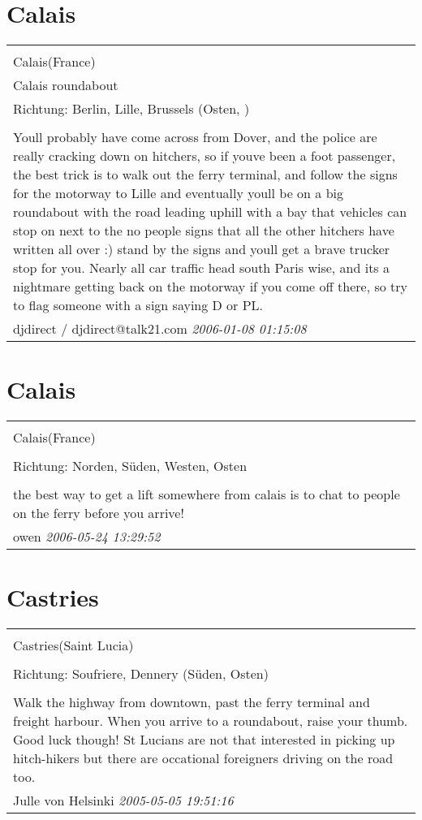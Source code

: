 \documentclass[a4paper,12pt]{article}
\begin{document}
\section{Calais}
\begin{tabular}{|p{13cm}|}
\hline\\
Calais(France)\\
Calais roundabout\\
Richtung: Berlin, Lille, Brussels (Osten, ) \\
\hline\\
Youll probably have come across from Dover, and the police are really cracking down on hitchers, so if youve been a foot passenger, the best trick is to walk out the ferry terminal, and follow the signs for the motorway to Lille and eventually youll be on a big roundabout with the road leading uphill with a bay that vehicles can stop on next to the no people signs that all the other hitchers have written all over :) stand by the signs and youll get a brave trucker stop for you. Nearly all car traffic head south Paris wise, and its a nightmare getting back on the motorway if you come off there, so try to flag someone with a sign saying D or PL. \\
djdirect / djdirect@talk21.com \textit{ 2006-01-08 01:15:08 }\\\hline
\end{tabular}


\section{Calais}
\begin{tabular}{|p{13cm}|}
\hline\\
Calais(France)\\
\\
Richtung: Norden, Süden, Westen, Osten \\
\hline\\
the best way to get a lift somewhere from calais is to chat to people on the ferry before you arrive! \\
owen \textit{ 2006-05-24 13:29:52 }\\\hline
\end{tabular}


\section{Castries}
\begin{tabular}{|p{13cm}|}
\hline\\
Castries(Saint Lucia)\\
\\
Richtung: Soufriere, Dennery (Süden, Osten) \\
\hline\\
Walk the highway from downtown, past the ferry terminal and freight harbour. When you arrive to a roundabout, raise your thumb. Good luck though! St Lucians are not that interested in picking up hitch-hikers but there are occational foreigners driving on the road too. \\
Julle von Helsinki \textit{ 2005-05-05 19:51:16 }\\\hline
\end{tabular}
\end{document}
